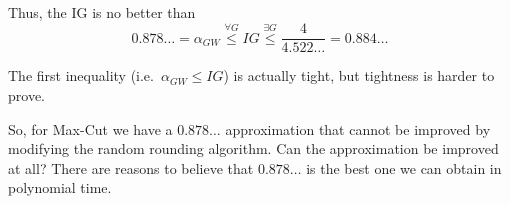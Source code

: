     Thus, the IG is no better than
    \[ 0.878\dots = \alpha_{GW} \overset{\forall G}{\leq} IG \overset{\exists G}{\leq} \dfrac{4}{4.522\dots} = 0.884\dots \]

    The first inequality (i.e.~$\alpha_{GW} \leq IG$) is actually tight, but tightness is harder to prove.

    So, for Max-Cut we have a $0.878\dots$ approximation that cannot be improved by modifying the random rounding algorithm.
    Can the approximation be improved at all?
    There are reasons to believe that $0.878\dots$ is the best one we can obtain in polynomial time.
